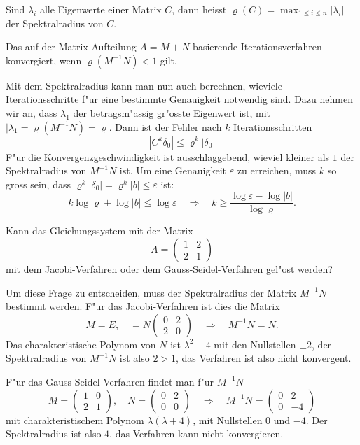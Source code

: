 \begin{definition}
Sind $\lambda_i$ alle Eigenwerte einer Matrix $C$, dann heisst
$\varrho(C)=\max_{1\le i\le n}|\lambda_i|$ der Spektralradius
von $C$.
\end{definition}

\begin{satz}
Das auf der Matrix-Aufteilung $A=M+N$ basierende Iterationsverfahren
konvergiert, wenn $\varrho(M^{-1}N)<1$ gilt.
\end{satz}

Mit dem Spektralradius kann man nun auch berechnen, wieviele Iterationsschritte
f"ur eine bestimmte Genauigkeit notwendig sind.
Dazu nehmen wir an, dass $\lambda_1$ der betragsm"assig gr"osste
Eigenwert ist, mit $|\lambda_1=\varrho(M^{-1}N)=\varrho$.
Dann ist der Fehler nach $k$ Iterationsschritten
\[
|C^k\delta_0|\le \varrho^k|\delta_0|
\]
F"ur die Konvergenzgeschwindigkeit ist ausschlaggebend, wieviel kleiner
als $1$ der Spektralradius von $M^{-1}N$ ist.
Um eine Genauigkeit $\varepsilon$ zu erreichen, muss $k$ so gross
sein, dass
$\varrho^k|\delta_0|=\varrho^k|b|\le \varepsilon$ ist:
\[
k\log\varrho+\log|b|\le \log\varepsilon
\quad
\Rightarrow
\quad
k\ge \frac{\log\varepsilon-\log|b|}{\log\varrho}.
\]

\begin{beispiel}
Kann das Gleichungssystem mit der Matrix 
\[
A=\begin{pmatrix}1&2\\2&1\end{pmatrix}
\]
mit dem Jacobi-Verfahren oder dem Gauss-Seidel-Verfahren gel"ost werden?

Um diese Frage zu entscheiden, muss der Spektralradius der
Matrix $M^{-1}N$ bestimmt werden.
F"ur das Jacobi-Verfahren ist dies die Matrix
\[
M=E,\quad = N\begin{pmatrix}0&2\\2&0\end{pmatrix}\quad
\Rightarrow
\quad
M^{-1}N=N.
\]
Das charakteristische Polynom von $N$ ist $\lambda^2-4$ mit den
Nullstellen $\pm2$, der Spektralradius von $M^{-1}N$ ist also $2> 1$,
das Verfahren ist also nicht konvergent.

F"ur das Gauss-Seidel-Verfahren findet man f"ur $M^{-1}N$
\[
M=\begin{pmatrix}1&0\\2&1\end{pmatrix},\quad
N=\begin{pmatrix}0&2\\0&0\end{pmatrix}\quad
\Rightarrow
\quad
M^{-1}N=\begin{pmatrix}0&2\\0&-4\end{pmatrix}
\]
mit charakteristischem Polynom $\lambda(\lambda+4)$, mit Nullstellen
$0$ und $-4$. Der Spektralradius ist also $4$, das Verfahren kann nicht
konvergieren.
\end{beispiel}


